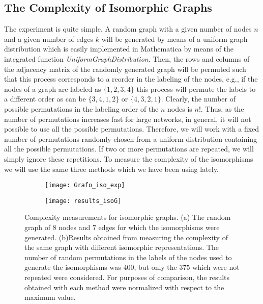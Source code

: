 \subsection{The Complexity of Isomorphic Graphs}
The experiment is quite simple. A random graph with a given number of nodes $n$ and a given number of edges $k$ will be generated by means of a uniform graph distribution which is easily implemented in Mathematica by means of the integrated function \textit{UniformGraphDistribution}. Then, the rows and columns of the adjacency matrix of the randomly generated graph will be permuted such that this process corresponds to a reorder in the labeling of the nodes, e.g., if the nodes of a graph are labeled as $\{1,2,3,4\}$ this process will permute the labels to a different order as can be $\{3,4,1,2\}$ or $\{4,3,2,1\}$. Clearly, the number of possible permutations in the labeling order of the $n$ nodes is $n!$. Thus, as the number of permutations increases fast for large networks, in general, it will not possible to use all the possible permutations. Therefore, we will work with a fixed number of permutations randomly chosen from a uniform distribution containing all the possible permutations. If two or more permutations are repeated, we will simply ignore these repetitions. To measure the complexity of the isomorphisms we will use the same three methods which we have been using lately.\\

\begin{figure}
	\centering
	\begin{subfigure}[b]{0.49\textwidth}
		\centering
		\texttt{[image: Grafo\_iso\_exp]}
		\caption{}
		\label{fig:Grafo_iso_exp}
	\end{subfigure}
	\hspace{0.5mm}
	\begin{subfigure}[b]{0.49\textwidth}
		\centering
		\texttt{[image: results\_isoG]}
		\caption{}
		\label{fig:results_isoG}
	\end{subfigure}
	\caption[Complexity measurements for isomorphic graphs.]{Complexity measurements for isomorphic graphs. (a) The random graph of $8$ nodes and $7$ edges for which the isomorphisms were generated. (b)Results obtained from measuring the complexity of the same graph with different isomorphic representations. The number of random permutations in the labels of the nodes used to generate the isomorphisms was $400$, but only the $375$ which were not repeated were considered. For purposes of comparison, the results obtained with each method were normalized with respect to the maximum value.}
	\label{fig:iso_G_complex_results}
\end{figure}

